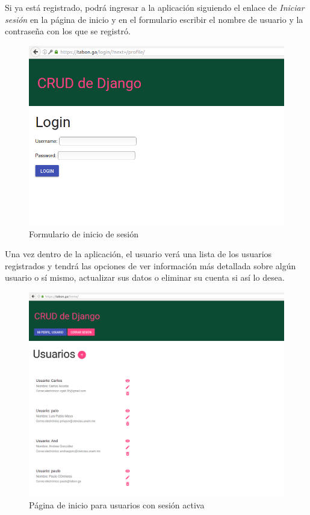 \documentclass[9pt]{article}
\begin{document}
Si ya está registrado, podrá ingresar a la aplicación siguiendo el enlace de \textit{Iniciar sesión} en la página de inicio y en el formulario escribir el nombre de usuario y la contraseña con los que se registró.
\begin{figure}[H]
  \centering
  \includegraphics[width=\textwidth]{crud/app3}
  \caption{Formulario de inicio de sesión}
\end{figure}


Una vez dentro de la aplicación, el usuario verá una lista de los usuarios registrados y tendrá las opciones de ver información más detallada sobre algún usuario o sí mismo, actualizar sus datos o eliminar su cuenta si así lo desea.\\
\begin{figure}[H]
  \centering
  \includegraphics[width=\textwidth]{crud/app5}
  \caption{Página de inicio para usuarios con sesión activa}
\end{figure}
\end{document}
